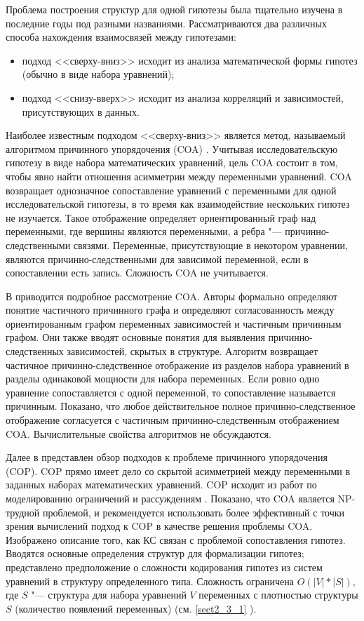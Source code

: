 Проблема построения структур для одной гипотезы была тщательно изучена в последние годы под разными названиями. 
\noindent Рассматриваются два различных способа нахождения взаимосвязей между гипотезами:
\begin{itemize}
    \item подход <<сверху-вниз>> исходит из анализа математической формы гипотез (обычно в виде набора уравнений);
    \item подход <<снизу-вверх>> исходит из анализа корреляций и зависимостей, присутствующих в данных.
\end{itemize}

Наиболее известным подходом <<сверху-вниз>> является метод, называемый алгоритмом причинного упорядочения 
(COA) \cite{simon1977causal}. Учитывая исследовательскую гипотезу в виде набора математических уравнений, цель 
COA состоит в том, чтобы явно найти отношения асимметрии между переменными уравнений. COA возвращает однозначное 
сопоставление уравнений с переменными для одной исследовательской гипотезы, в то время как взаимодействие нескольких 
гипотез не изучается. Такое отображение определяет ориентированный граф над переменными, где вершины являются 
переменными, а ребра "--- причинно-следственными связями. Переменные, присутствующие в некотором уравнении, 
являются причинно-следственными для зависимой переменной, если в сопоставлении есть запись. 
Сложность COA не учитывается.

В \cite{dash2008note} приводится подробное рассмотрение COA. Авторы формально определяют понятие 
частичного причинного графа и определяют согласованность между ориентированным графом переменных зависимостей 
и частичным причинным графом. Они также вводят основные понятия для выявления причинно-следственных зависимостей, 
скрытых в структуре. Алгоритм возвращает частичное причинно-следственное отображение из разделов набора уравнений 
в разделы одинаковой мощности для набора переменных. Если ровно одно уравнение сопоставляется с одной переменной, 
то сопоставление называется причинным. Показано, что любое действительное полное причинно-следственное отображение 
согласуется с частичным причинно-следственным отображением COA. Вычислительные свойства алгоритмов не обсуждаются. 

Далее в \cite{Goncalves2016} представлен обзор подходов к проблеме причинного упорядочения (COP). COP прямо имеет 
дело со скрытой асимметрией между переменными в заданных наборах математических уравнений. COP исходит из работ по 
моделированию ограничений и рассуждениям \cite{nayak1994causal}. Показано, что COA является NP-трудной проблемой, и 
рекомендуется использовать более эффективный с точки зрения вычислений подход к COP в качестве решения проблемы COA. 
Изображено описание того, как КС связан с проблемой сопоставления гипотез. Вводятся основные определения структур для 
формализации гипотез; представлено предположение о сложности кодирования гипотез из систем уравнений в структуру 
определенного типа. Сложность ограничена $O(|V|*|S|)$, где $S$ "---  структура для набора уравнений $V$ переменных 
с плотностью структуры $S$ (количество появлений переменных) (см. \cref{sect2_3_1} ).

